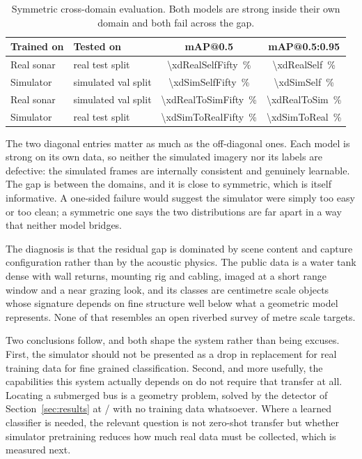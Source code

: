 \documentclass[10pt,a4paper]{article}
\begin{document}
\begin{table}[htbp]\centering\small
\caption{Symmetric cross-domain evaluation. Both models are strong inside
their own domain and both fail across the gap.}
\begin{tabular}{llcc}
\toprule
\textbf{Trained on} & \textbf{Tested on} & \textbf{mAP@0.5} & \textbf{mAP@0.5:0.95} \\
\midrule
Real sonar & real test split & \SI{\xdRealSelfFifty}{\percent} & \SI{\xdRealSelf}{\percent} \\
Simulator & simulated val split & \SI{\xdSimSelfFifty}{\percent} & \SI{\xdSimSelf}{\percent} \\
\midrule
Real sonar & simulated val split & \SI{\xdRealToSimFifty}{\percent} & \SI{\xdRealToSim}{\percent} \\
Simulator & real test split & \SI{\xdSimToRealFifty}{\percent} & \SI{\xdSimToReal}{\percent} \\
\bottomrule
\end{tabular}
\end{table}

The two diagonal entries matter as much as the off-diagonal ones. Each model
is strong on its own data, so neither the simulated imagery nor its labels are
defective: the simulated frames are internally consistent and genuinely
learnable. The gap is between the domains, and it is close to symmetric, which
is itself informative. A one-sided failure would suggest the simulator were
simply too easy or too clean; a symmetric one says the two distributions are
far apart in a way that neither model bridges.

The diagnosis is that the residual gap is dominated by scene content and
capture configuration rather than by the acoustic physics. The public data is a
water tank dense with wall returns, mounting rig and cabling, imaged at a short
range window and a near grazing look, and its classes are centimetre scale
objects whose signature depends on fine structure well below what a geometric
model represents. None of that resembles an open riverbed survey of metre scale
targets.

Two conclusions follow, and both shape the system rather than being excuses.
First, the simulator should not be presented as a drop in replacement for real
training data for fine grained classification. Second, and more usefully, the
capabilities this system actually depends on do not require that transfer at
all. Locating a submerged bus is a geometry problem, solved by the detector of
Section~\ref{sec:results} at \detPrimary{}/\detPrimaryTotal{} with no training
data whatsoever. Where a learned classifier is needed, the relevant question is
not zero-shot transfer but whether simulator pretraining reduces how much real
data must be collected, which is measured next.
\end{document}
